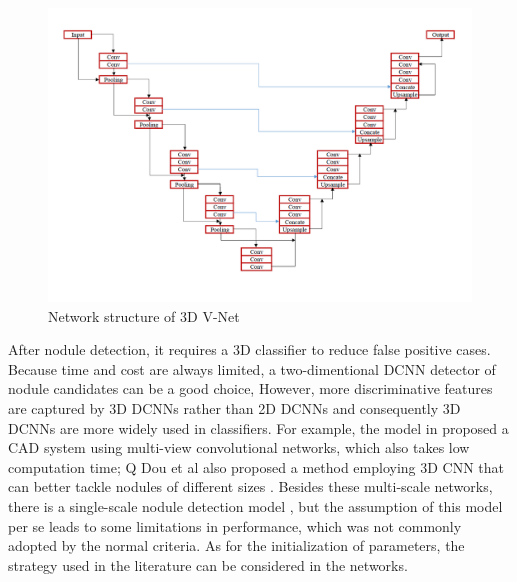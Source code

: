 \documentclass[conference]{IEEEtran}
\begin{document}
\begin{figure}[htbp]
    \centering
    \centerline{\includegraphics[scale=1.1]{3dvnet.png}}
    \caption{Network structure of 3D V-Net}
    \label{fig2}
    \end{figure}
After nodule detection, it requires a 3D classifier to reduce false positive cases. Because time and cost are always limited, a two-dimentional DCNN detector of nodule candidates can be a good choice, However, more discriminative features are captured by 3D DCNNs rather than 2D DCNNs and consequently 3D DCNNs are more widely used in classifiers. For example, the model in \cite{7422783} proposed a CAD system using multi-view convolutional networks, which also takes low computation time; Q Dou et al also proposed a method employing 3D CNN that can better tackle nodules of different sizes \cite{7576695}. Besides these multi-scale networks, there is a single-scale nodule detection model \cite{10.1007/978-3-030-00934-2_88}, but the assumption of this model per se leads to some limitations in performance, which was not commonly adopted by the normal criteria. As for the initialization of parameters, the strategy used in the literature \cite{He_2015_ICCV} can be considered in the networks.
\end{document}
